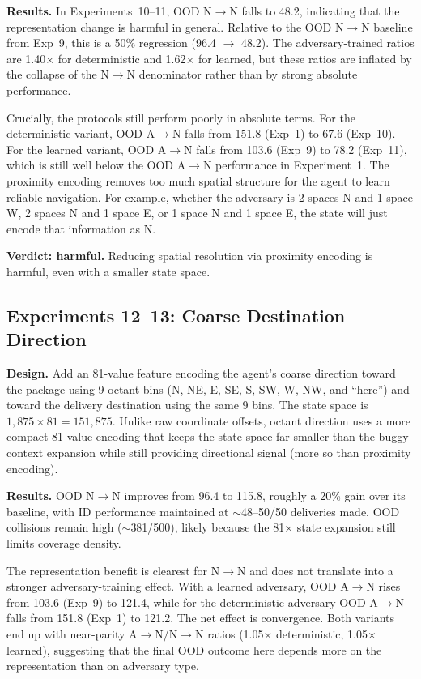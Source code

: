 \documentclass[sigconf]{aamas}
\begin{document}
\textbf{Results.} In Experiments~10--11, OOD N$\to$N falls to 48.2, indicating that the representation change is harmful in general.
Relative to the OOD N$\to$N baseline from Exp~9, this is a
50\% regression (96.4 $\to$ 48.2). The adversary-trained ratios are
1.40$\times$ for deterministic and 1.62$\times$ for learned,
but these ratios are inflated by the collapse of the N$\to$N denominator rather
than by strong absolute performance.

Crucially, the protocols still perform poorly in absolute terms. For the
deterministic variant, OOD A$\to$N falls from 151.8 (Exp~1) to 67.6 (Exp~10).
For the learned variant, OOD A$\to$N falls from 103.6 (Exp~9) to 78.2
(Exp~11), which is still well below the OOD A$\to$N performance in Experiment~1. The proximity encoding removes too much spatial structure for the
agent to learn reliable navigation. For example, whether the adversary is 2
spaces N and 1 space W, 2 spaces N and 1 space E, or 1 space N and 1 space E,
the state will just encode that information as N.

\textbf{Verdict: harmful.} Reducing spatial resolution via proximity encoding is harmful, even with a smaller state space.

\subsection{Experiments 12--13: Coarse Destination Direction}
\textbf{Design.} Add an 81-value feature encoding the agent's coarse direction toward
the package using 9 octant bins (N, NE, E, SE, S, SW, W, NW, and ``here'') and
toward the delivery destination using the same 9 bins. The state space is
$1{,}875 \times 81 = 151{,}875$. Unlike raw coordinate offsets, octant direction uses a more compact 81-value encoding that keeps the state space far smaller than the buggy context expansion while still providing directional signal (more so than proximity encoding).

\textbf{Results.} OOD N$\to$N improves from 96.4 to 115.8, roughly a
20\% gain over its baseline, with ID
performance maintained at $\sim$48--50/50 deliveries made. OOD collisions remain high
($\sim$381/500), likely because the 81$\times$ state expansion still limits
coverage density.

The representation benefit is clearest for N$\to$N and does not translate into
a stronger adversary-training effect. With a learned adversary, OOD A$\to$N
rises from 103.6 (Exp~9) to 121.4, while for the deterministic adversary OOD
A$\to$N falls from 151.8 (Exp~1) to 121.2. The net effect is convergence.
Both variants end up with near-parity A$\to$N/N$\to$N ratios
(1.05$\times$ deterministic, 1.05$\times$ learned), suggesting that the final
OOD outcome here depends more on the representation than on adversary type.
\end{document}
